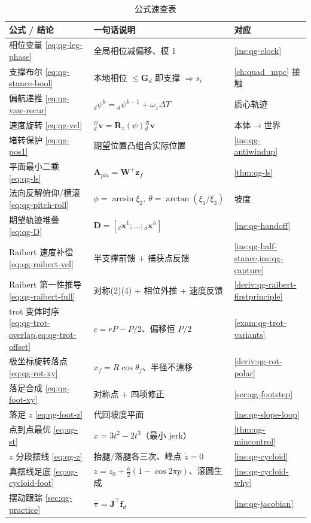 \begin{table}[H]\centering\small
\caption{公式速查表}
\begin{tabular}{lll}
\toprule
公式 / 结论 & 一句话说明 & 对应 \\
\midrule
相位变量 \cref{eq:qg-leg-phase} & 全局相位减偏移、模 1 & \cref{ins:qg-clock} \\
支撑布尔 \cref{eq:qg-stance-bool} & 本地相位 $\le\mathbf{G}_d$ 即支撑 $\Rightarrow s_i$ & \cref{ch:quad_mpc} 接触 \\
偏航递推 \cref{eq:qg-yaw-recur} & ${}_d\psi^k={}_d\psi^{k-1}+\omega_z\Delta T$ & 质心轨迹 \\
速度旋转 \cref{eq:qg-vel} & ${}_d^{\mathcal{O}}\boldsymbol{v}=\mathbf{R}_z(\psi){}_d^{\mathcal{B}}\boldsymbol{v}$ & 本体$\to$世界 \\
堵转保护 \cref{eq:qg-pos1} & 期望位置凸组合实际位置 & \cref{ins:qg-antiwindup} \\
平面最小二乘 \cref{eq:qg-ls} & $\mathbf{A}_{pla}=\mathbf{W}^{+}\boldsymbol{z}_f$ & \cref{thm:qg-ls} \\
法向反解俯仰/横滚 \cref{eq:qg-pitch-roll} & $\phi=\arcsin\xi_2,\ \theta=\arctan(\xi_1/\xi_3)$ & 坡度 \\
期望轨迹堆叠 \cref{eq:qg-D} & $\mathbf{D}=[{}_d\boldsymbol{x}^1;\dots;{}_d\boldsymbol{x}^h]$ & \cref{ins:qg-handoff} \\
Raibert 速度补偿 \cref{eq:qg-raibert-vel} & 半支撑前馈 + 捕获点反馈 & \cref{ins:qg-half-stance,ins:qg-capture} \\
Raibert 第一性推导 \cref{eq:qg-raibert-full} & 对称(2)(4) + 相位外推 + 速度反馈 & \cref{deriv:qg-raibert-firstprinciple} \\
trot 变体时序 \cref{eq:qg-trot-overlap,eq:qg-trot-offset} & $c=rP-P/2$、偏移恒 $P/2$ & \cref{exam:qg-trot-variants} \\
极坐标旋转落点 \cref{eq:qg-rot-xy} & $x_f=R\cos\theta_f$、半径不漂移 & \cref{deriv:qg-rot-polar} \\
落足合成 \cref{eq:qg-foot-xy} & 对称点 + 四项修正 & \cref{sec:qg-footstep} \\
落足 $z$ \cref{eq:qg-foot-z} & 代回坡度平面 & \cref{ins:qg-slope-loop} \\
点到点最优 \cref{eq:qg-st} & $x=3t^2-2t^3$（最小 jerk） & \cref{thm:qg-mincontrol} \\
$z$ 分段摆线 \cref{eq:qg-z} & 抬腿/落腿各三次、峰点 $\dot z=0$ & \cref{ins:qg-cycloid} \\
真摆线足底 \cref{eq:qg-cycloid-foot} & $z=z_0+\tfrac{h}{2}(1-\cos2\pi p)$、滚圆生成 & \cref{ins:qg-cycloid-why} \\
摆动跟踪 \cref{sec:qg-practice} & $\boldsymbol{\tau}=\mathbf{J}^\top\boldsymbol{f}_d$ & \cref{ins:qg-jacobian} \\
\bottomrule
\end{tabular}
\end{table}

